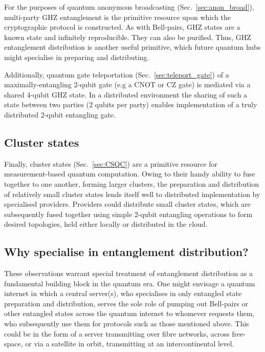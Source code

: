 For the purposes of quantum anonymous broadcasting (Sec.~\ref{sec:anon_broad}), multi-party GHZ entanglement is the primitive resource upon which the cryptographic protocol is constructed. As with Bell-pairs, GHZ states are a known state and infinitely reproducible. They can also be purified. Thus, GHZ entanglement distribution is another useful primitive, which future quantum hubs might specialise in preparing and distributing.

Additionally, quantum gate teleportation (Sec.~\ref{sec:teleport_gate}) of a maximally-entangling 2-qubit gate (e.g a CNOT or CZ gate) is mediated via a shared 4-qubit GHZ state. In a distributed environment the sharing of such a state between two parties (2 qubits per party) enables implementation of a truly distributed 2-qubit entangling gate.


%
%

\subsection{Cluster states}

Finally, cluster states (Sec.~\ref{sec:CSQC}) are a primitive resource for measurement-based quantum computation. Owing to their handy ability to fuse together to one another, forming larger clusters, the preparation and distribution of relatively small cluster states lends itself well to distributed implementation by specialised providers. Providers could distribute small cluster states, which are subsequently fused together using simple 2-qubit entangling operations to form desired topologies, held either locally or distributed in the cloud.

%
%

\subsection{Why specialise in entanglement distribution?}

These observations warrant special treatment of entanglement distribution as a fundamental building block in the quantum era. One might envisage a quantum internet in which a central server(s), who specialises in only entangled state preparation and distribution, serves the sole role of pumping out Bell-pairs or other entangled states across the quantum internet to whomever requests them, who subsequently use them for protocols such as those mentioned above. This could be in the form of a server transmitting over fibre networks, across free-space, or via a satellite in orbit, transmitting at an intercontinental level.

